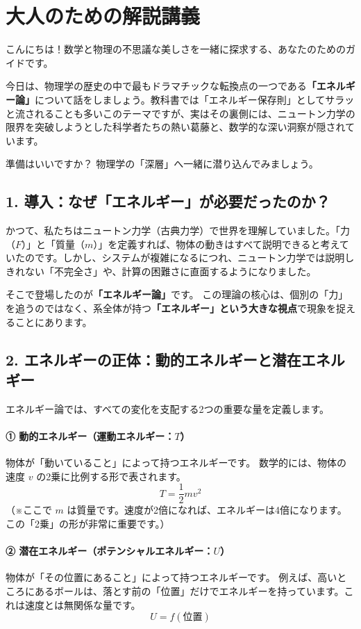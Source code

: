 \documentclass[a4paper,11pt,openany]{ltjsbook}
\begin{document}
\section{大人のための解説講義}
\begin{lecturebox}
こんにちは！数学と物理の不思議な美しさを一緒に探求する、あなたのためのガイドです。

今日は、物理学の歴史の中で最もドラマチックな転換点の一つである\textbf{「エネルギー論」}について話をしましょう。教科書では「エネルギー保存則」としてサラッと流されることも多いこのテーマですが、実はその裏側には、ニュートン力学の限界を突破しようとした科学者たちの熱い葛藤と、数学的な深い洞察が隠されています。

準備はいいですか？ 物理学の「深層」へ一緒に潜り込んでみましょう。

\subsection*{1. 導入：なぜ「エネルギー」が必要だったのか？}

かつて、私たちはニュートン力学（古典力学）で世界を理解していました。「力（$F$）」と「質量（$m$）」を定義すれば、物体の動きはすべて説明できると考えていたのです。しかし、システムが複雑になるにつれ、ニュートン力学では説明しきれない「不完全さ」や、計算の困難さに直面するようになりました。

そこで登場したのが\textbf{「エネルギー論」}です。
この理論の核心は、個別の「力」を追うのではなく、系全体が持つ\textbf{「エネルギー」という大きな視点}で現象を捉えることにあります。

\subsection*{2. エネルギーの正体：動的エネルギーと潜在エネルギー}

エネルギー論では、すべての変化を支配する2つの重要な量を定義します。

\paragraph{① 動的エネルギー（運動エネルギー：$T$）}
物体が「動いていること」によって持つエネルギーです。
数学的には、物体の速度 $v$ の2乗に比例する形で表されます。
$$T = \frac{1}{2}mv^2$$
（※ここで $m$ は質量です。速度が2倍になれば、エネルギーは4倍になります。この「2乗」の形が非常に重要です。）

\paragraph{② 潜在エネルギー（ポテンシャルエネルギー：$U$）}
物体が「その位置にあること」によって持つエネルギーです。
例えば、高いところにあるボールは、落とす前の「位置」だけでエネルギーを持っています。これは速度とは無関係な量です。
$$U = f(\text{位置})$$


\end{lecturebox}
\end{document}

